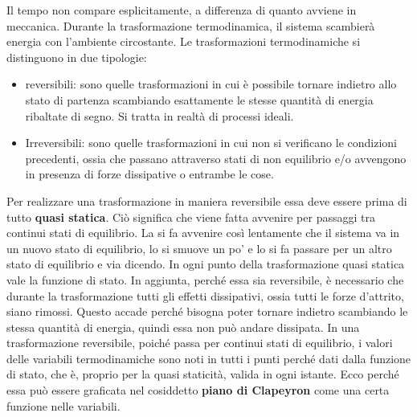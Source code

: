 \documentclass[10pt,a4paper]{book}
\begin{document}
\begin{figure}[htpb]
\end{figure}
\FloatBarrier
Il tempo non compare esplicitamente, a differenza di quanto avviene in meccanica. Durante la trasformazione termodinamica, il sistema scambierà energia con l'ambiente circostante.
Le trasformazioni termodinamiche si distinguono in due tipologie:
\begin{itemize}
	\item reversibili: sono quelle trasformazioni in cui è possibile tornare indietro allo stato di partenza scambiando esattamente le stesse quantità di energia ribaltate di segno. Si tratta in realtà di processi ideali.
	\item Irreversibili: sono quelle trasformazioni in cui non si verificano le condizioni precedenti, ossia che passano attraverso stati di non equilibrio e/o avvengono in presenza di forze dissipative o entrambe le cose.
\end{itemize}
Per realizzare una trasformazione in maniera reversibile essa deve essere prima di tutto \textbf{quasi statica}. Ciò significa che viene fatta avvenire per passaggi tra continui stati di equilibrio. La si fa avvenire così lentamente che il sistema va in un nuovo stato di equilibrio, lo si smuove un po' e lo si fa passare per un altro stato di equilibrio e via dicendo. In ogni punto della trasformazione quasi statica vale la funzione di stato. In aggiunta, perché essa sia reversibile, è necessario che durante la trasformazione tutti gli effetti dissipativi, ossia tutti le forze d'attrito, siano rimossi. Questo accade perché bisogna poter tornare indietro scambiando le stessa quantità di energia, quindi essa non può andare dissipata.
In una trasformazione reversibile, poiché passa per continui stati di equilibrio, i valori delle variabili termodinamiche sono noti in tutti i punti perché dati dalla funzione di stato, che è, proprio per la quasi staticità, valida in ogni istante. Ecco perché essa può essere graficata nel cosiddetto \textbf{piano di Clapeyron} come una certa funzione nelle variabili.
\end{document}
